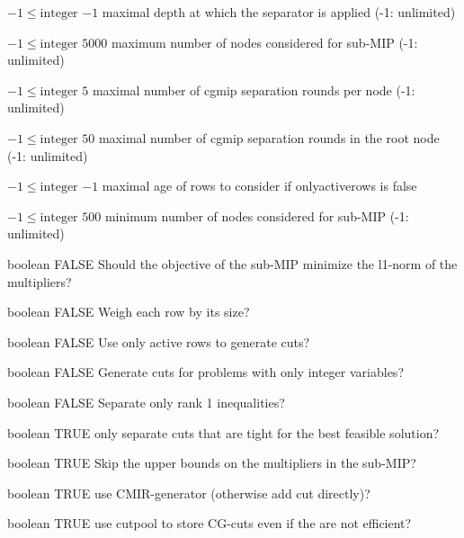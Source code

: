 %
{$-1\leq\textrm{integer}$}%
{$-1$}%
{maximal depth at which the separator is applied (-1: unlimited)}%
{}

%
{$-1\leq\textrm{integer}$}%
{$5000$}%
{maximum number of nodes considered for sub-MIP (-1: unlimited)}%
{}

%
{$-1\leq\textrm{integer}$}%
{$5$}%
{maximal number of cgmip separation rounds per node (-1: unlimited)}%
{}

%
{$-1\leq\textrm{integer}$}%
{$50$}%
{maximal number of cgmip separation rounds in the root node (-1: unlimited)}%
{}

%
{$-1\leq\textrm{integer}$}%
{$-1$}%
{maximal age of rows to consider if onlyactiverows is false}%
{}

%
{$-1\leq\textrm{integer}$}%
{$500$}%
{minimum number of nodes considered for sub-MIP (-1: unlimited)}%
{}

%
{boolean}%
{FALSE}%
{Should the objective of the sub-MIP minimize the l1-norm of the multipliers?}%
{}

%
{boolean}%
{FALSE}%
{Weigh each row by its size?}%
{}

%
{boolean}%
{FALSE}%
{Use only active rows to generate cuts?}%
{}

%
{boolean}%
{FALSE}%
{Generate cuts for problems with only integer variables?}%
{}

%
{boolean}%
{FALSE}%
{Separate only rank 1 inequalities?}%
{}

%
{boolean}%
{TRUE}%
{only separate cuts that are tight for the best feasible solution?}%
{}

%
{boolean}%
{TRUE}%
{Skip the upper bounds on the multipliers in the sub-MIP?}%
{}

%
{boolean}%
{TRUE}%
{use CMIR-generator (otherwise add cut directly)?}%
{}

%
{boolean}%
{TRUE}%
{use cutpool to store CG-cuts even if the are not efficient?}%
{}

